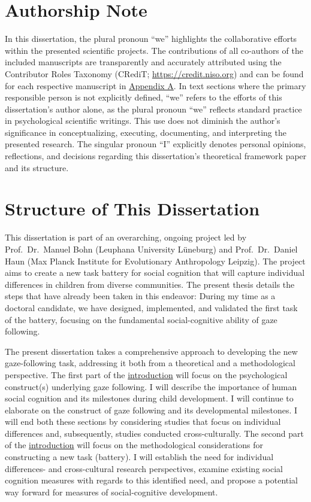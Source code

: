\documentclass[
]{scrbook}
\begin{document}
\chapter*{Authorship Note}\label{authorship}

In this dissertation, the plural pronoun ``we'' highlights the collaborative efforts within the presented scientific projects. The contributions of all co-authors of the included manuscripts are transparently and accurately attributed using the Contributor Roles Taxonomy (CRediT; \mbox{\url{https://credit.niso.org}}) and can be found for each respective manuscript in \hyperref[appendixA]{Appendix A}. In text sections where the primary responsible person is not explicitly defined, ``we'' refers to the efforts of this dissertation's author alone, as the plural pronoun ``we'' reflects standard practice in psychological scientific writings. This use does not diminish the author's significance in conceptualizing, executing, documenting, and interpreting the presented research. The singular pronoun ``I'' explicitly denotes personal opinions, reflections, and decisions regarding this dissertation's theoretical framework paper and its structure.

\chapter*{Structure of This Dissertation}\label{structure}

This dissertation is part of an overarching, ongoing project led by Prof.~Dr.~Manuel Bohn (Leuphana University Lüneburg) and Prof.~Dr.~Daniel Haun (Max Planck Institute for Evolutionary Anthropology Leipzig). The project aims to create a new task battery for social cognition that will capture individual differences in children from diverse communities. The present thesis details the steps that have already been taken in this endeavor: During my time as a doctoral candidate, we have designed, implemented, and validated the first task of the battery, focusing on the fundamental social-cognitive ability of gaze following.

The present dissertation takes a comprehensive approach to developing the new gaze-following task, addressing it both from a theoretical and a methodological perspective. The first part of the \hyperref[introduction]{introduction} will focus on the psychological construct(s) underlying gaze following. I will describe the importance of human social cognition and its milestones during child development. I will continue to elaborate on the construct of gaze following and its developmental milestones. I will end both these sections by considering studies that focus on individual differences and, subsequently, studies conducted cross-culturally. The second part of the \hyperref[introduction]{introduction} will focus on the methodological considerations for constructing a new task (battery). I will establish the need for individual differences- and cross-cultural research perspectives, examine existing social cognition measures with regards to this identified need, and propose a potential way forward for measures of social-cognitive development.
\end{document}
